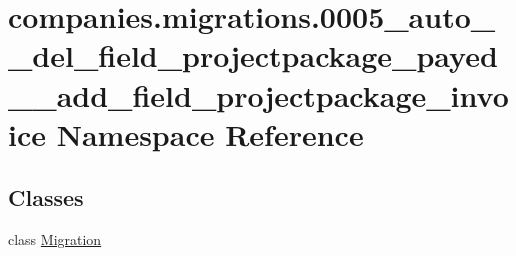 \hypertarget{namespacecompanies_1_1migrations_1_10005__auto____del__field__projectpackage__payed____add__field__projectpackage__invoice}{\section{companies.\-migrations.0005\-\_\-auto\-\_\-\-\_\-del\-\_\-field\-\_\-projectpackage\-\_\-payed\-\_\-\-\_\-add\-\_\-field\-\_\-projectpackage\-\_\-invoice Namespace Reference}
\label{namespacecompanies_1_1migrations_1_10005__auto____del__field__projectpackage__payed____add__field__projectpackage__invoice}
}
\subsection*{Classes}
\begin{DoxyCompactItemize}
\item 
class \hyperlink{classcompanies_1_1migrations_1_10005__auto____del__field__projectpackage__payed____add__field__pe9cf5cf6afe1151e043f1d94db59b0b0}{Migration}
\end{DoxyCompactItemize}

